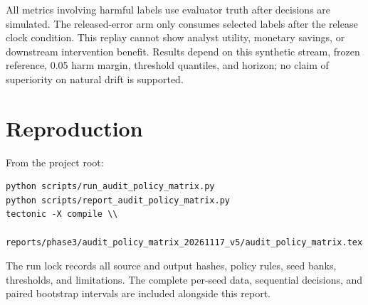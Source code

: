 \documentclass[10pt]{article}
\begin{document}
All metrics involving harmful labels use evaluator truth after decisions are simulated. The released-error arm only consumes selected labels after the release clock condition. This replay cannot show analyst utility, monetary savings, or downstream intervention benefit. Results depend on this synthetic stream, frozen reference, 0.05 harm margin, threshold quantiles, and horizon; no claim of superiority on natural drift is supported.
\section{Reproduction}
From the project root:
\begin{verbatim}
python scripts/run_audit_policy_matrix.py
python scripts/report_audit_policy_matrix.py
tectonic -X compile \\
  reports/phase3/audit_policy_matrix_20261117_v5/audit_policy_matrix.tex
\end{verbatim}
The run lock records all source and output hashes, policy rules, seed banks, thresholds, and limitations. The complete per-seed data, sequential decisions, and paired bootstrap intervals are included alongside this report.
\end{document}
